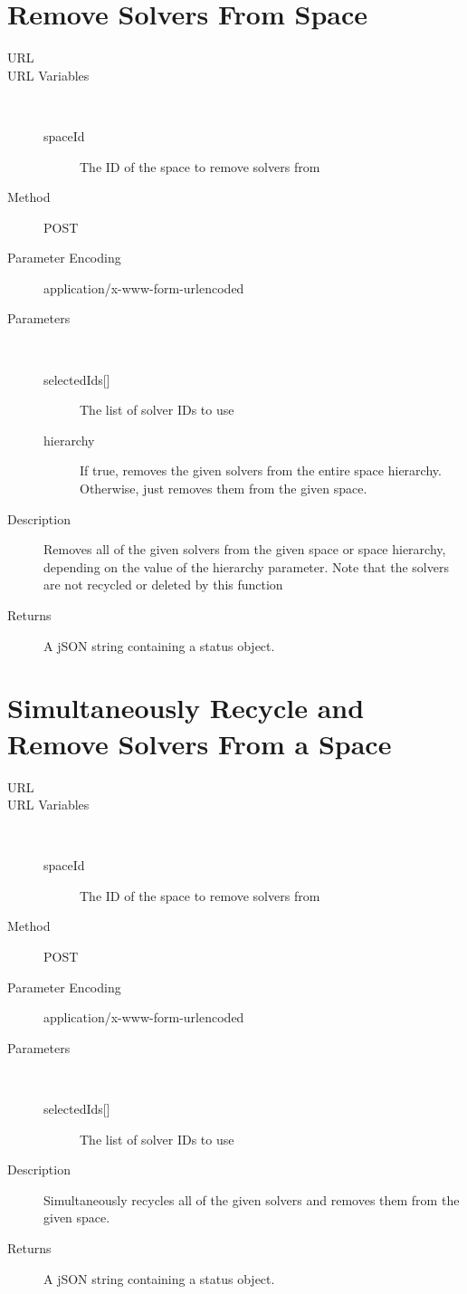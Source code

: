\section{Remove Solvers From Space}
\begin{description}
\item [URL] 
\item [URL Variables] \
	\begin{description}
	\item [spaceId]  The ID of the space to remove solvers from
	\end{description}
\item [Method] POST
\item [Parameter Encoding] application/x-www-form-urlencoded
\item [Parameters] \
	\begin{description}
	\item [{selectedIds[]}]  The list of solver IDs to use
	\item [hierarchy]  If true, removes the given solvers from the entire space hierarchy. Otherwise, just removes them from the given space.
	\end{description}
\item [Description] Removes all of the given solvers from the given space or space hierarchy, depending on the value of the hierarchy parameter. Note that the solvers are not recycled or deleted by this function
\item [Returns] A jSON string containing a status object.
\end{description}

\section{Simultaneously Recycle and Remove Solvers From a Space}
\begin{description}
\item [URL] 
\item [URL Variables] \
	\begin{description}
	\item [spaceId] \type{Integer} The ID of the space to remove solvers from
	\end{description}
\item [Method] POST
\item [Parameter Encoding] application/x-www-form-urlencoded
\item [Parameters] \
	\begin{description}
	\item [{selectedIds[]}]  The list of solver IDs to use
	\end{description}
\item [Description] Simultaneously recycles all of the given solvers and removes them from the given space.
\item [Returns] A jSON string containing a status object.
\end{description}



